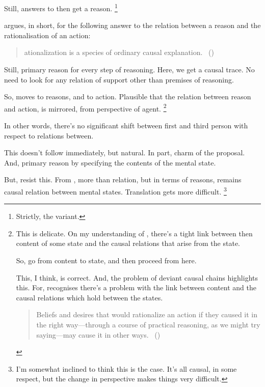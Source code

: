 \begin{note}
  Still, answers to \qWhy{} then get a reason.%
  \footnote{
    Strictly, the variant.
  }

  \citeauthor{Davidson:1963aa} argues, in short, for the following answer to the relation between a reason and the rationalisation of an action:

  \begin{quote}
    \begin{enumerate}[label=\arabic*]
      [R]ationalization is a species of ordinary causal explanation.\newline
      \mbox{ }\hfill\mbox{(\citeyear[685]{Davidson:1963aa})}
    \end{enumerate}
  \end{quote}

  Still, primary reason for every step of reasoning.
  Here, we get a causal trace.
  No need to look for any relation of support other than premises of reasoning.

  So, \citeauthor{Davidson:1963aa} moves to reasons, and to action.
  Plausible that the relation between reason and action, is mirrored, from perspective of agent.%
  \footnote{
    This is delicate.
  On my understanding of \citeauthor{Davidson:1963aa}, there's a tight link between then content of some state and the causal relations that arise from the state.

  So, go from content to state, and then proceed from here.

  This, I think, is correct.
  And, the problem of deviant causal chains highlights this.
  For, \citeauthor{Davidson:1963aa} recognises there's a problem with the link between content and the causal relations which hold between the states.

  \begin{quote}
    Beliefs and desires that would rationalize an action if they caused it in the right way—through a course of practical reasoning, as we might try saying---may cause it in other ways.%
    \mbox{ }\hfill\mbox{(\citeyear[79]{Davidson:1973vd})}
  \end{quote}
  }

  In other words, there's no significant shift between first and third person with respect to relations between.

  This doesn't follow immediately, but natural.
  In part, charm of the proposal.
  And, primary reason by specifying the contents of the mental state.

  But, resist this.
  From \agpe{}, more than relation, but in terms of reasons, remains causal relation between mental states.
  Translation gets more difficult.%
  \footnote{
    I'm somewhat inclined to think this is the case.
    It's all causal, in some respect, but the change in perspective makes things very difficult.
  }


\end{note}
